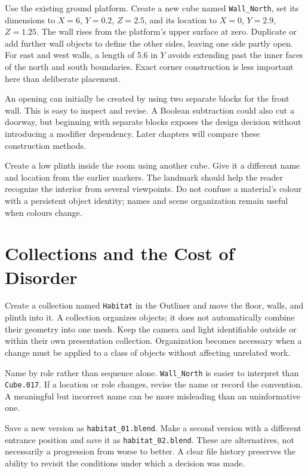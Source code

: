 \documentclass[11pt,openany]{book}
\newcommand{\obj}[1]{\texttt{#1}}
\newcommand{\file}[1]{\texttt{#1}}
\begin{document}
Use the existing ground platform. Create a new cube named \obj{Wall\_North}, set its dimensions to $X=6$, $Y=0.2$, $Z=2.5$, and its location to $X=0$, $Y=2.9$, $Z=1.25$. The wall rises from the platform's upper surface at zero. Duplicate or add further wall objects to define the other sides, leaving one side partly open. For east and west walls, a length of 5.6 in $Y$ avoids extending past the inner faces of the north and south boundaries. Exact corner construction is less important here than deliberate placement.

An opening can initially be created by using two separate blocks for the front wall. This is easy to inspect and revise. A Boolean subtraction could also cut a doorway, but beginning with separate blocks exposes the design decision without introducing a modifier dependency. Later chapters will compare these construction methods.

Create a low plinth inside the room using another cube. Give it a different name and location from the earlier markers. The landmark should help the reader recognize the interior from several viewpoints. Do not confuse a material's colour with a persistent object identity; names and scene organization remain useful when colours change.

\section{Collections and the Cost of Disorder}

Create a collection named \obj{Habitat} in the Outliner and move the floor, walls, and plinth into it. A collection organizes objects; it does not automatically combine their geometry into one mesh. Keep the camera and light identifiable outside or within their own presentation collection. Organization becomes necessary when a change must be applied to a class of objects without affecting unrelated work.

Name by role rather than sequence alone. \obj{Wall\_North} is easier to interpret than \obj{Cube.017}. If a location or role changes, revise the name or record the convention. A meaningful but incorrect name can be more misleading than an uninformative one.

Save a new version as \file{habitat\_01.blend}. Make a second version with a different entrance position and save it as \file{habitat\_02.blend}. These are alternatives, not necessarily a progression from worse to better. A clear file history preserves the ability to revisit the conditions under which a decision was made.
\end{document}
